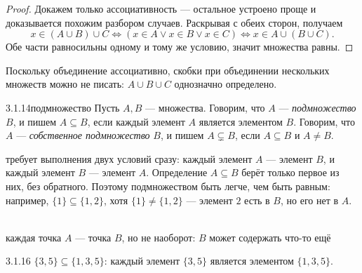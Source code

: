 \begin{proof}
Докажем только ассоциативность — остальное устроено проще и доказывается похожим
разбором случаев. Раскрывая  с обеих сторон, получаем
\[
  x \in (A \cup B) \cup C \iff (x \in A \lor x \in B \lor x \in C)
  \iff x \in A \cup (B \cup C).
\]
Обе части равносильны одному и тому же условию, значит множества равны.
\end{proof}

\begin{remark}
Поскольку объединение ассоциативно, скобки при объединении нескольких множеств можно не
писать: $A \cup B \cup C$ однозначно определено.
\end{remark}

\begin{definition}{3.1.14}{подмножество}
Пусть $A,B$ — множества. Говорим, что $A$ — \emph{подмножество} $B$, и пишем $A \subseteq B$,
если каждый элемент $A$ является элементом $B$. Говорим, что $A$ — \emph{собственное
подмножество} $B$, и пишем $A \subsetneq B$, если $A \subseteq B$ и $A \neq B$.
\end{definition}

\begin{intuition}
 требует выполнения двух условий сразу: каждый элемент $A$ —
элемент $B$, и каждый элемент $B$ — элемент $A$. Определение $A \subseteq B$ берёт только
первое из них, без обратного. Поэтому подмножеством быть легче, чем быть равным: например,
$\{1\} \subseteq \{1,2\}$, хотя $\{1\} \neq \{1,2\}$ — элемент $2$ есть в $B$, но его нет
в $A$.

\begin{center}
\\
{\footnotesize\color{intuitiongray}каждая точка $A$ — точка $B$, но не наоборот: $B$
может содержать что-то ещё}
\end{center}
\end{intuition}

\begin{example}{3.1.16}{}
$\{3,5\} \subseteq \{1,3,5\}$: каждый элемент $\{3,5\}$ является элементом $\{1,3,5\}$.
\end{example}

